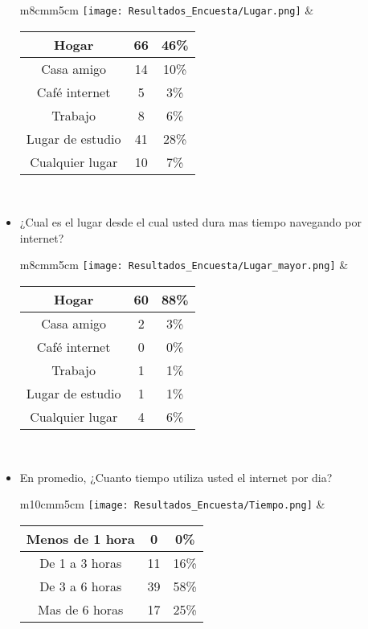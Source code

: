 \begin{itemize}
      \begin{tabular}{m{8cm}m{5cm}}
        \texttt{[image: Resultados\_Encuesta/Lugar.png]} &
        \begin{tabular}{|c|cc|}
        \hline
         Hogar & 66 & 46\% \\ \hline
         Casa amigo & 14 & 10\% \\ \hline
         Café internet & 5 & 3\% \\ \hline
         Trabajo & 8 & 6\% \\ \hline
         Lugar de estudio & 41 & 28\% \\ \hline
         Cualquier lugar & 10 & 7\% \\ \hline
        \end{tabular} \\
      \end{tabular}
  \item ¿Cual es el lugar desde el cual usted dura mas tiempo navegando por internet? \\
      \begin{tabular}{m{8cm}m{5cm}}
        \texttt{[image: Resultados\_Encuesta/Lugar\_mayor.png]} &
        \begin{tabular}{|c|cc|}
        \hline
         Hogar & 60 & 88\% \\ \hline
         Casa amigo & 2 & 3\% \\ \hline
         Café internet & 0 & 0\% \\ \hline
         Trabajo & 1 & 1\% \\ \hline
         Lugar de estudio & 1 & 1\% \\ \hline
         Cualquier lugar & 4 & 6\% \\ \hline
        \end{tabular} \\
      \end{tabular}
  \item En promedio, ¿Cuanto tiempo utiliza usted el internet por dia? \\
      \begin{tabular}{m{10cm}m{5cm}}
        \texttt{[image: Resultados\_Encuesta/Tiempo.png]} &
        \begin{tabular}{|c|cc|}
        \hline
         Menos de 1 hora & 0 & 0\% \\ \hline
         De 1 a 3 horas & 11 & 16\% \\ \hline
         De 3 a 6 horas & 39 & 58\% \\ \hline
         Mas de 6 horas & 17 & 25\% \\ \hline

\end{tabular}
\end{tabular}
\end{itemize}
